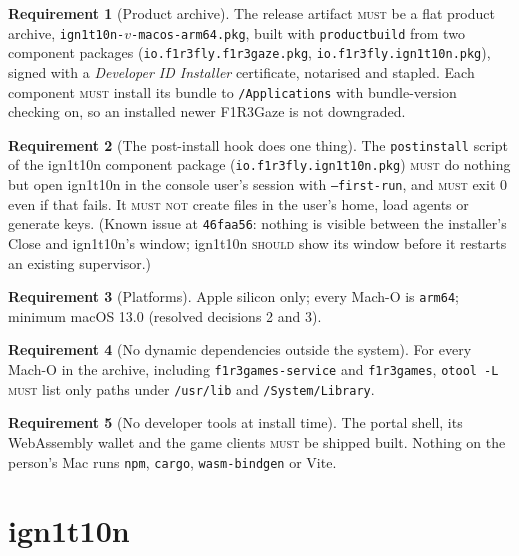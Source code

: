 \documentclass[11pt]{article}
\theoremstyle{definition}
\newtheorem{requirement}{Requirement}
\theoremstyle{remark}
\newcommand{\MUST}{\textsc{must}}
\newcommand{\MUSTNOT}{\textsc{must not}}
\newcommand{\SHOULD}{\textsc{should}}
\newcommand{\code}[1]{\texttt{#1}}
\newcommand{\Gz}{F1R3Gaze}
\newcommand{\Hr}{ign1t10n}
\begin{document}
\begin{requirement}[Product archive]
The release artifact \MUST{} be a flat product archive,
\code{ign1t10n-}$v$\code{-macos-arm64.pkg}, built with \code{productbuild} from two
component packages (\code{io.f1r3fly.f1r3gaze.pkg}, \code{io.f1r3fly.ign1t10n.pkg}),
signed with a \emph{Developer ID Installer} certificate, notarised and stapled. Each
component \MUST{} install its bundle to \code{/Applications} with bundle-version
checking on, so an installed newer \Gz{} is not downgraded.
\end{requirement}

\begin{requirement}[The post-install hook does one thing]
The \code{postinstall} script of the \Hr{} component package
(\code{io.f1r3fly.ign1t10n.pkg}) \MUST{} do nothing but open \Hr{} in the console user's session with \code{--first-run}, and \MUST{}
exit 0 even if that fails. It \MUSTNOT{} create files in the user's home, load agents
or generate keys. (Known issue at \code{46faa56}: nothing is visible between the
installer's Close and \Hr{}'s window; \Hr{} \SHOULD{} show its window before it
restarts an existing supervisor.)
\end{requirement}

\begin{requirement}[Platforms]
Apple silicon only; every Mach-O is \code{arm64}; minimum macOS 13.0 (resolved
decisions 2 and 3).
\end{requirement}

\begin{requirement}[No dynamic dependencies outside the system]
For every Mach-O in the archive, including \code{f1r3games-service} and
\code{f1r3games}, \code{otool -L} \MUST{} list only paths under \code{/usr/lib} and
\code{/System/Library}.
\end{requirement}

\begin{requirement}[No developer tools at install time]
The portal shell, its WebAssembly wallet and the game clients \MUST{} be shipped
built. Nothing on the person's Mac runs \code{npm}, \code{cargo},
\code{wasm-bindgen} or Vite.
\end{requirement}

\section{\Hr{}}\label{sec:ign}
\end{document}
